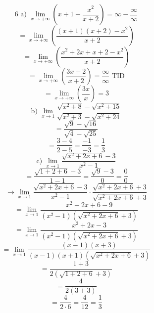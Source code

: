 \documentclass{article}
\begin{document}
\[
\text{6 a) } \lim_{x \to +\infty} \left(x+1 - \frac{x^2}{x+2}\right) = \infty - \frac{\infty}{\infty}
\]
\[
= \lim_{x \to +\infty} \left(\frac{(x+1)(x+2) - x^2}{x+2}\right)
\]
\[
= \lim_{x \to +\infty} \left(\frac{x^2+2x+x+2 - x^2}{x+2}\right)
\]
\[
= \lim_{x \to +\infty} \left(\frac{3x+2}{x+2}\right) = \frac{\infty}{\infty} \text{ TID}
\]
\[
= \lim_{x \to +\infty} \left(\frac{3x}{x}\right) = 3
\]
\[
\text{b) } \lim_{x \to 1} \frac{\sqrt{x^2+8} - \sqrt{x^2+15}}{\sqrt{x^2+3} - \sqrt{x^2+24}}
\]
\[
 = \frac{\sqrt{9} - \sqrt{16}}{\sqrt{4} - \sqrt{25}}
\]
\[
= \frac{3 - 4}{2 - 5} = \frac{-1}{-3} = \frac{1}{3}
\]
\[
\text{c) } \lim_{x \to 1} \frac{\sqrt{x^2+2x+6} - 3}{x^2-1}
\]
\[
= \frac{\sqrt{1+2+6} - 3}{1-1} = \frac{\sqrt{9} - 3}{0} = \frac{0}{0}
\]
\[
\to \lim_{x \to 1} \frac{\sqrt{x^2+2x+6} - 3}{x^2-1} \cdot \frac{\sqrt{x^2+2x+6} + 3}{\sqrt{x^2+2x+6} + 3}
\]
\[
= \lim_{x \to 1} \frac{x^2+2x+6 - 9}{(x^2-1)(\sqrt{x^2+2x+6} + 3)}
\]
\[
= \lim_{x \to 1} \frac{x^2+2x-3}{(x^2-1)(\sqrt{x^2+2x+6} + 3)}
\]
\[
= \lim_{x \to 1} \frac{(x-1)(x+3)}{(x-1)(x+1)(\sqrt{x^2+2x+6} + 3)}
\]
\[
= \frac{1+3}{2(\sqrt{1+2+6} + 3)}
\]
\[
= \frac{4}{2(3+3)}
\]
\[
= \frac{4}{2 \cdot 6} = \frac{4}{12} = \frac{1}{3}
\]
\end{document}
